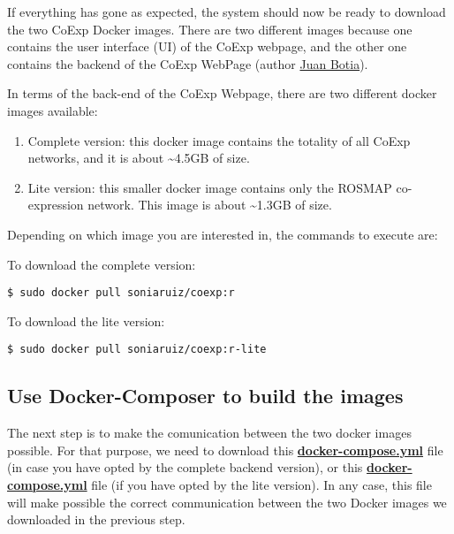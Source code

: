 \documentclass[]{book}
\providecommand{\tightlist}{%
  \setlength{\itemsep}{0pt}\setlength{\parskip}{0pt}}
\begin{document}
If everything has gone as expected, the system should now be ready to
download the two CoExp Docker images. There are two different images
because one contains the user interface (UI) of the CoExp webpage, and
the other one contains the backend of the CoExp WebPage (author
\href{https://github.com/juanbot/CoExpNets}{Juan Botia}).

In terms of the back-end of the CoExp Webpage, there are two different
docker images available:

\begin{enumerate}
\def\labelenumi{\arabic{enumi}.}
\tightlist
\item
  Complete version: this docker image contains the totality of all CoExp
  networks, and it is about \textasciitilde{}4.5GB of size.
\item
  Lite version: this smaller docker image contains only the ROSMAP
  co-expression network. This image is about \textasciitilde{}1.3GB of
  size.
\end{enumerate}

Depending on which image you are interested in, the commands to execute
are:

To download the complete version:

\begin{verbatim}
$ sudo docker pull soniaruiz/coexp:r
\end{verbatim}

To download the lite version:

\begin{verbatim}
$ sudo docker pull soniaruiz/coexp:r-lite
\end{verbatim}

\subsection{Use Docker-Composer to build the
images}\label{use-docker-composer-to-build-the-images}

The next step is to make the comunication between the two docker images
possible. For that purpose, we need to download this
\href{https://github.com/SoniaRuiz/IPDGC/blob/master/complete/docker-compose.yml}{\textbf{docker-compose.yml}}
file (in case you have opted by the complete backend version), or this
\href{https://github.com/SoniaRuiz/IPDGC/blob/master/lite/docker-compose.yml}{\textbf{docker-compose.yml}}
file (if you have opted by the lite version). In any case, this file
will make possible the correct communication between the two Docker
images we downloaded in the previous step.
\end{document}
